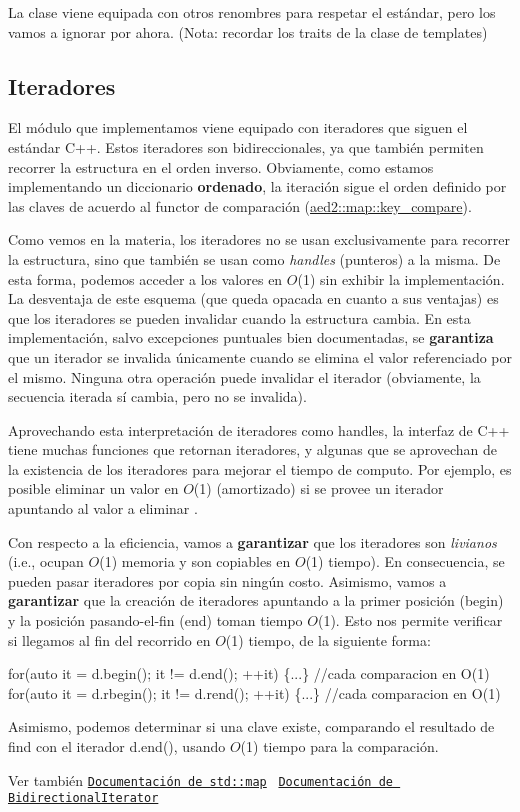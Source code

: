 La clase viene equipada con otros renombres para respetar el estándar, pero los vamos a ignorar por ahora. (Nota\+: recordar los traits de la clase de templates)\hypertarget{Interfaz_Iteradores}{}\subsection{Iteradores}\label{Interfaz_Iteradores}
El módulo que implementamos viene equipado con iteradores que siguen el estándar C++. Estos iteradores son bidireccionales, ya que también permiten recorrer la estructura en el orden inverso. Obviamente, como estamos implementando un diccionario {\bfseries ordenado}, la iteración sigue el orden definido por las claves de acuerdo al functor de comparación (\hyperlink{classaed2_1_1map_a3efa081d3379ab76f33a5ef9fe697523_a3efa081d3379ab76f33a5ef9fe697523}{aed2\+::map\+::key\+\_\+compare}).

Como vemos en la materia, los iteradores no se usan exclusivamente para recorrer la estructura, sino que también se usan como {\itshape handles} (punteros) a la misma. De esta forma, podemos acceder a los valores en $O$(1) sin exhibir la implementación. La desventaja de este esquema (que queda opacada en cuanto a sus ventajas) es que los iteradores se pueden invalidar cuando la estructura cambia. En esta implementación, salvo excepciones puntuales bien documentadas, se {\bfseries garantiza} que un iterador se invalida únicamente cuando se elimina el valor referenciado por el mismo. Ninguna otra operación puede invalidar el iterador (obviamente, la secuencia iterada sí cambia, pero no se invalida).

Aprovechando esta interpretación de iteradores como handles, la interfaz de C++ tiene muchas funciones que retornan iteradores, y algunas que se aprovechan de la existencia de los iteradores para mejorar el tiempo de computo. Por ejemplo, es posible eliminar un valor en $O$(1) (amortizado) si se provee un iterador apuntando al valor a eliminar \cite{MehlhornSanders2008}.

Con respecto a la eficiencia, vamos a {\bfseries garantizar} que los iteradores son {\itshape livianos} (i.\+e., ocupan $O$(1) memoria y son copiables en $O$(1) tiempo). En consecuencia, se pueden pasar iteradores por copia sin ningún costo. Asimismo, vamos a {\bfseries garantizar} que la creación de iteradores apuntando a la primer posición ({\ttfamily begin}) y la posición pasando-\/el-\/fin ({\ttfamily end}) toman tiempo $O$(1). Esto nos permite verificar si llegamos al fin del recorrido en $O$(1) tiempo, de la siguiente forma\+: 
\begin{DoxyCode}
\textcolor{keywordflow}{for}(\textcolor{keyword}{auto} it = d.begin(); it != d.end(); ++it) \{...\}   \textcolor{comment}{//cada comparacion en O(1)}
\textcolor{keywordflow}{for}(\textcolor{keyword}{auto} it = d.rbegin(); it != d.rend(); ++it) \{...\} \textcolor{comment}{//cada comparacion en O(1)}
\end{DoxyCode}
 Asimismo, podemos determinar si una clave existe, comparando el resultado de {\ttfamily find} con el iterador {\ttfamily d.\+end()}, usando $O$(1) tiempo para la comparación.

\begin{DoxySeeAlso}{Ver también}
\href{http://en.cppreference.com/w/cpp/container/map}{\tt Documentación de std\+::map}~\newline
 \href{http://en.cppreference.com/w/cpp/concept/BidirectionalIterator}{\tt Documentación de Bidirectional\+Iterator} 
\end{DoxySeeAlso}
